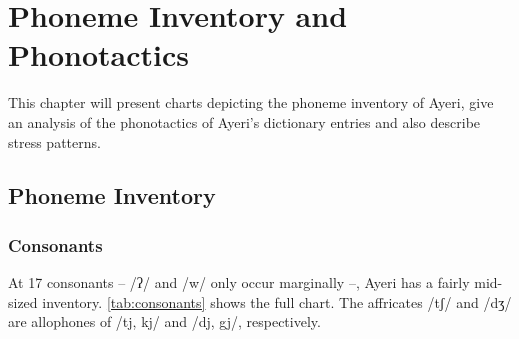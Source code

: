 \chapter{Phoneme Inventory and Phonotactics}

This chapter will present charts depicting the phoneme inventory of Ayeri, 
give an analysis of the phonotactics of Ayeri's dictionary entries and also 
describe stress patterns.

\section{Phoneme Inventory}

\subsection{Consonants}

At 17 consonants -- /ʔ/ and /w/ only occur marginally --, Ayeri has a fairly 
mid-sized inventory. \autoref{tab:consonants} shows the full chart. The 
affricates /tʃ/ and /dʒ/ are allophones of /tj, kj/ and /dj, gj/, respectively.

